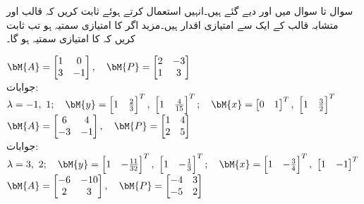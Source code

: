 سوال  تا سوال  میں  اور  دیے گئے ہیں۔انہیں استعمال کرتے ہوئے ثابت کریں کہ قالب  اور متشابہ قالب  کے ایک  سے  امتیازی اقدار ہیں۔مزید اگر  کا امتیازی سمتیہ  ہو تب ثابت کریں کہ  کا امتیازی سمتیہ  ہو گا۔

\quad
$\bM{A}=\begin{bmatrix} 1&0\\3&-1 \end{bmatrix},\quad \bM{P}=\begin{bmatrix} 2&-3\\1&3 \end{bmatrix}$\\
جوابات:
$\lambda=-1,\,\, 1;\quad \bM{y}=\begin{bmatrix} 1&\tfrac{2}{3} \end{bmatrix}^T,\,\,\begin{bmatrix} 1&\tfrac{4}{15} \end{bmatrix}^T; \quad 
\bM{x}=\begin{bmatrix} 0&1 \end{bmatrix}^T,\,\, \begin{bmatrix} 1&\tfrac{3}{2} \end{bmatrix}^T$
\quad
$\bM{A}=\begin{bmatrix} 6&4\\-3&-1 \end{bmatrix},\quad \bM{P}=\begin{bmatrix} 1&4\\2&5 \end{bmatrix}$\\
جوابات:
$\lambda=3,\,\,2;\quad \bM{y}=\begin{bmatrix} 1&-\tfrac{11}{32} \end{bmatrix}^T,\,\,\begin{bmatrix} 1&-\tfrac{1}{3} \end{bmatrix}^T; \quad 
\bM{x}=\begin{bmatrix} 1&-\tfrac{3}{4} \end{bmatrix}^T,\,\, \begin{bmatrix} 1&-1 \end{bmatrix}^T$
\quad
$\bM{A}=\begin{bmatrix} -6&-10\\2&3 \end{bmatrix},\quad \bM{P}=\begin{bmatrix} -4&3\\-5&2 \end{bmatrix}$\\
